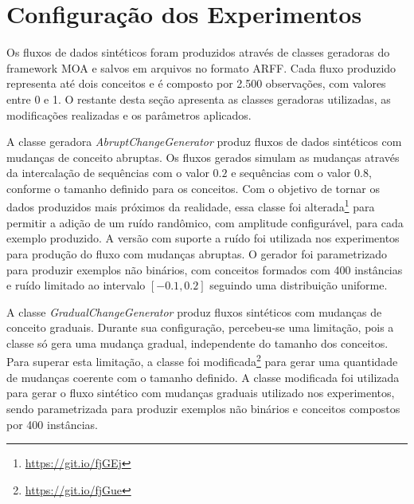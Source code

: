 \documentclass[msc, classic, a4paper]{ufbathesis}
\begin{document}
\section{Configuração dos Experimentos}
\label{sec:configuracao_experimentos}

Os fluxos de dados sintéticos foram produzidos através de classes geradoras do framework MOA e salvos em arquivos no formato ARFF. %
Cada fluxo produzido representa até dois conceitos e é composto por 2.500 observações, com valores entre 0 e 1.
O restante desta seção apresenta as classes geradoras utilizadas, as modificações realizadas e os parâmetros aplicados.

A classe geradora \textit{AbruptChangeGenerator} produz fluxos de dados sintéticos com mudanças de conceito abruptas.
Os fluxos gerados simulam as mudanças através da intercalação de sequências com o valor $0.2$ e sequências com o valor $0.8$, conforme o tamanho definido para os conceitos.
Com o objetivo de tornar os dados produzidos mais próximos da realidade, essa classe foi alterada\footnote{\url{https://git.io/fjGEj}} para permitir a adição de um ruído randômico, com amplitude configurável, para cada exemplo produzido.
A versão com suporte a ruído foi utilizada nos experimentos para produção do fluxo com mudanças abruptas.
O gerador foi parametrizado para produzir exemplos não binários, com conceitos formados com 400 instâncias e ruído limitado ao intervalo $[-0.1, 0.2]$ seguindo uma distribuição uniforme.



A classe \textit{GradualChangeGenerator} produz fluxos sintéticos com mudanças de conceito graduais.
Durante sua configuração, percebeu-se uma limitação, pois a classe só gera uma mudança gradual, independente do tamanho dos conceitos.
Para superar esta limitação, a classe foi modificada\footnote{\url{https://git.io/fjGue}} para gerar uma quantidade de mudanças coerente com o tamanho definido.
A classe modificada foi utilizada para gerar o fluxo sintético com mudanças graduais utilizado nos experimentos,
sendo parametrizada para produzir exemplos não binários e conceitos compostos por 400 instâncias.
\end{document}

